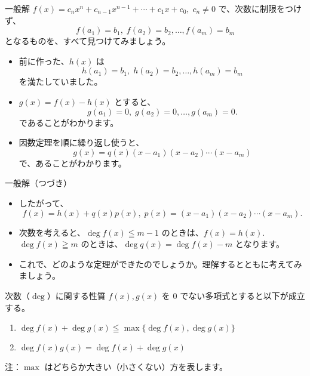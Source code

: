 \documentclass[10pt, dvipdfmx]{beamer}
\begin{document}
\begin{frame}{一般解}
\(f(x) = c_nx^n + c_{n-1}x^{n-1} + \cdots + c_1x+c_0, \; c_n \neq 0\) で、次数に制限をつけず、  
\[ f(a_1) = b_1, \; f(a_2) = b_2, \ldots, f(a_m) = b_m \] 
となるものを、すべて見つけてみましょう。\par
\begin{itemize}
\item 前に作った、\(h(x)\) は
\[ h(a_1) = b_1, \; h(a_2) = b_2, \ldots, h(a_m) = b_m \] 
を満たしていました。
\item \(g(x) = f(x)-h(x)\) とすると、 
\[ g(a_1) = 0, \; g(a_2) = 0, \ldots, g(a_m) = 0. \] 
であることがわかります。
\item 因数定理を順に繰り返し使うと、
\[ g(x) = q(x)(x-a_1)(x-a_2)\cdots (x-a_m) \] 
で、あることがわかります。
\end{itemize}
\end{frame}
\begin{frame}{一般解（つづき）}
\begin{itemize}
\item したがって、 
\[ f(x) = h(x) + q(x)p(x), \; p(x) = (x-a_1)(x-a_2)\cdots (x-a_m). \]
\item 次数を考えると、\(\deg f(x) \leqq m-1\) のときは、\(f(x) = h(x)\). \(\deg f(x) \geqq m\) のときは、\(\deg q(x) = \deg f(x)-m\) となります。
\item これで、どのような定理ができたのでしょうか。理解するとともに考えてみましょう。
\end{itemize}

\begin{block}{次数（$\deg$）に関する性質}
$f(x), g(x)$ を $0$ でない多項式とすると以下が成立する。
\begin{enumerate}
\item $\deg f(x) + \deg g(x) \leqq \max\{\deg f(x), \deg g(x)\}$
\item $\deg f(x)g(x) = \deg f(x) + \deg g(x)$
\end{enumerate}
注：$\max$ はどちらか大きい（小さくない）方を表します。
\end{block}
\end{frame}
\end{document}

